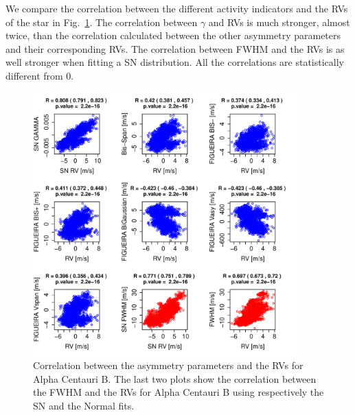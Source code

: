 \documentclass[11pt, oneside]{article}
\begin{document}
We compare the correlation between the different activity indicators and the RVs of the star in Fig.~\ref{fig:alphacent:corrPlot}. The correlation between $\gamma$ and RVs is much stronger, almost twice, than the correlation calculated between the other asymmetry parameters and their corresponding RVs. The correlation between FWHM and the RVs is as well stronger when fitting a SN distribution. All the correlations are statistically different from $0$.

\begin{figure}[htbp]
   \centering
\includegraphics[height = 4in]{HD12862_[4]Comparison_para.pdf}  
   \caption{Correlation between the asymmetry parameters and the RVs for Alpha Centauri B. The last two plots show the correlation between the FWHM and the RVs for Alpha Centauri B using respectively the SN and the Normal fits.}
   \label{fig:alphacent:corrPlot}
\end{figure}
\end{document}

